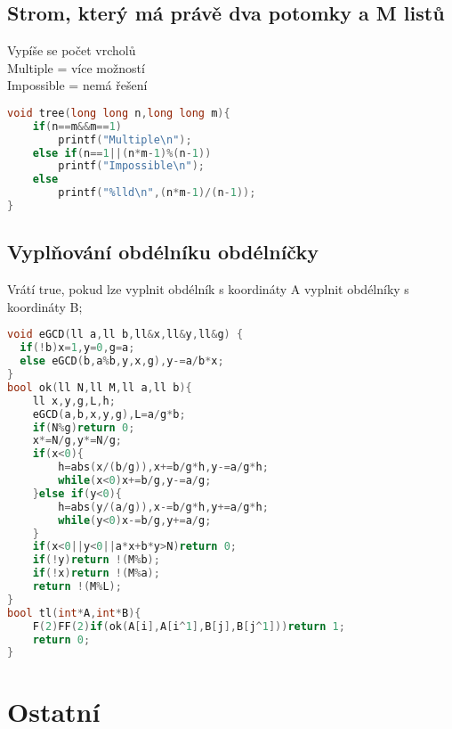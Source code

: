 \documentclass[11pt]{article}
\begin{document}
\subsection{Strom, který má právě dva potomky a M listů}
Vypíše se počet vrcholů
\\Multiple = více možností
\\Impossible = nemá řešení
\begin{lstlisting}[language=C++]
void tree(long long n,long long m){
    if(n==m&&m==1)
        printf("Multiple\n");
    else if(n==1||(n*m-1)%(n-1))
        printf("Impossible\n");
    else
        printf("%lld\n",(n*m-1)/(n-1));
}
\end{lstlisting}
\subsection{Vyplňování obdélníku obdélníčky}
Vrátí true, pokud lze vyplnit obdélník s koordináty \textsf{A} vyplnit obdélníky s koordináty \textsf{B};
\begin{lstlisting}[language=C++]
void eGCD(ll a,ll b,ll&x,ll&y,ll&g) {
  if(!b)x=1,y=0,g=a;
  else eGCD(b,a%b,y,x,g),y-=a/b*x;
}
bool ok(ll N,ll M,ll a,ll b){
    ll x,y,g,L,h;
    eGCD(a,b,x,y,g),L=a/g*b;
    if(N%g)return 0;
    x*=N/g,y*=N/g;
    if(x<0){
        h=abs(x/(b/g)),x+=b/g*h,y-=a/g*h;
        while(x<0)x+=b/g,y-=a/g;
    }else if(y<0){
        h=abs(y/(a/g)),x-=b/g*h,y+=a/g*h;
        while(y<0)x-=b/g,y+=a/g;
    }
    if(x<0||y<0||a*x+b*y>N)return 0;
    if(!y)return !(M%b);
    if(!x)return !(M%a);
    return !(M%L);
}
bool tl(int*A,int*B){
    F(2)FF(2)if(ok(A[i],A[i^1],B[j],B[j^1]))return 1;
    return 0;
}
\end{lstlisting}
\newpage\section{Ostatní}
\end{document}
